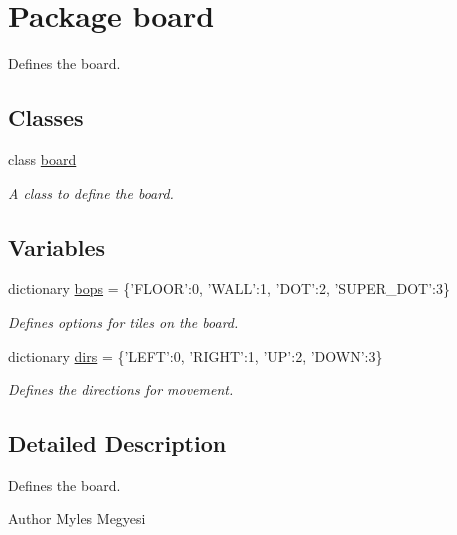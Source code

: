 \hypertarget{namespaceboard}{
\section{Package board}
\label{namespaceboard}
}


Defines the board.  


\subsection*{Classes}
\begin{DoxyCompactItemize}
\item 
class \hyperlink{classboard_1_1board}{board}
\begin{DoxyCompactList}\small\item\em A class to define the board. \item\end{DoxyCompactList}\end{DoxyCompactItemize}
\subsection*{Variables}
\begin{DoxyCompactItemize}
\item 
\hypertarget{namespaceboard_a16dbd9d98b30fdc3cea7f8072548976c}{
dictionary \hyperlink{namespaceboard_a16dbd9d98b30fdc3cea7f8072548976c}{bops} = \{'FLOOR':0, 'WALL':1, 'DOT':2, 'SUPER\_\-DOT':3\}}
\label{namespaceboard_a16dbd9d98b30fdc3cea7f8072548976c}

\begin{DoxyCompactList}\small\item\em Defines options for tiles on the board. \item\end{DoxyCompactList}\item 
\hypertarget{namespaceboard_a40095e3a6c324a5ff7584339f6660a76}{
dictionary \hyperlink{namespaceboard_a40095e3a6c324a5ff7584339f6660a76}{dirs} = \{'LEFT':0, 'RIGHT':1, 'UP':2, 'DOWN':3\}}
\label{namespaceboard_a40095e3a6c324a5ff7584339f6660a76}

\begin{DoxyCompactList}\small\item\em Defines the directions for movement. \item\end{DoxyCompactList}\end{DoxyCompactItemize}


\subsection{Detailed Description}
Defines the board. \begin{DoxyAuthor}{Author}
Myles Megyesi 
\end{DoxyAuthor}
